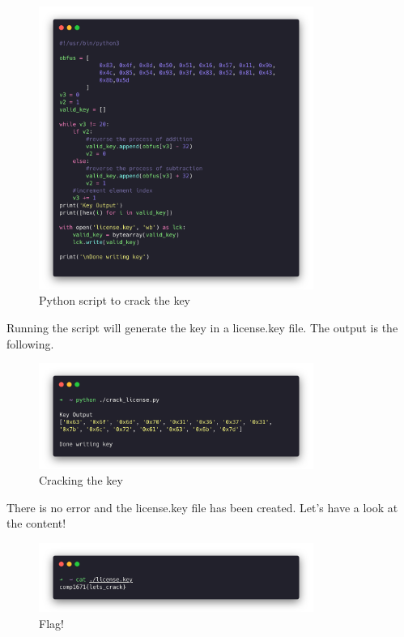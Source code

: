 \begin{figure}[H]
  \centering
  \includegraphics[width=0.8\textwidth]{figures/crack-license}
  \caption{Python script to crack the key}
  \label{f:crack-license}
\end{figure}

Running the script will generate the key in a license.key file. The output is
the following.

\begin{figure}[H]
  \centering
  \includegraphics[width=0.8\textwidth]{figures/run-crack}
  \caption{Cracking the key}
  \label{f:run-crack}
\end{figure}

There is no error and the license.key file has been created. Let's have a look
at the content!

\begin{figure}[H]
  \centering
  \includegraphics[width=0.8\textwidth]{figures/flag}
  \caption{Flag!}
  \label{f:flag}
\end{figure}

